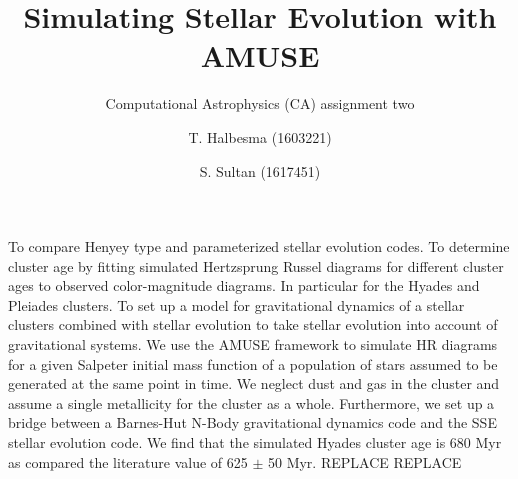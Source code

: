 \documentclass{aa}
\begin{document}
   \title{Simulating Stellar Evolution with AMUSE}

   \subtitle{Computational Astrophysics (CA) assignment two}

   \author{T. Halbesma (1603221)
          \and
          S. Sultan (1617451)
          }




  \abstract
   {}
   {To compare Henyey type and parameterized stellar evolution codes. To determine cluster age by fitting simulated Hertzsprung Russel diagrams for different cluster ages to observed color-magnitude diagrams. In particular for the Hyades and Pleiades clusters. To set up a model for gravitational dynamics of a stellar clusters combined with stellar evolution to take stellar evolution into account of gravitational systems.}
   {We use the AMUSE framework to simulate HR diagrams for a given Salpeter initial mass function of a population of stars assumed to be generated at the same point in time. We neglect dust and gas in the cluster and assume a single metallicity for the cluster as a whole. Furthermore, we set up a bridge between a Barnes-Hut N-Body gravitational dynamics code and the SSE stellar evolution code.}
   {We find that the simulated Hyades cluster age is 680 Myr as compared the literature value of 625 $\pm$ 50 Myr. REPLACE }
   {REPLACE}


   \maketitle
%
\end{document}
